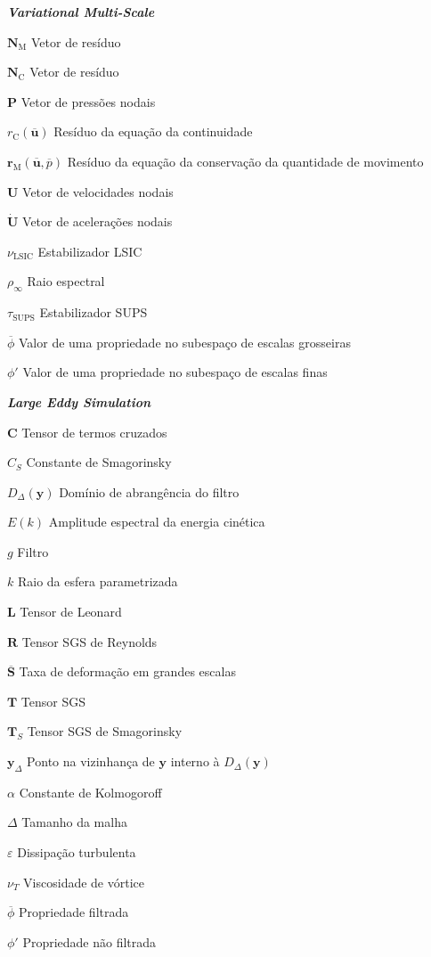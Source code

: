 \documentclass[12pt,
	openright,	%
	twoside,    %
	a4paper,			%
	sumario=tradicional,
	english,			%
	french, 			%
	brazil				%
]{USPSC}
\renewcommand{\bar}[1]{\overline{#1}}
\newcommand{\BB}[1]{\mathbf{#1}}
\newcommand{\BBB}[1]{\overline{\mathbf{#1}}}
\newcommand{\Dfil}{D_\Delta(\BB{y})}
\newcommand{\yfil}{\BB{y}_\Delta}
\newcommand{\deffil}{\bar{\mathbf{S}}}
\newcommand{\lsic}{\mathrm{LSIC}}
\newcommand{\sups}{\mathrm{SUPS}}
\newcommand{\rM}{\BB{r}_\mathrm{M}(\BBB{u},\bar{p})}
\newcommand{\rC}{r_\mathrm{C}(\BBB{u})}
\newcommand{\NM}{\BB{N}_\mathrm{M}}
\newcommand{\NC}{\BB{N}_\mathrm{C}}
\newcommand{\ep}{\varepsilon}
\begin{document}
\begin{simbolos}
    \item[\textbf{\textit{Variational Multi-Scale}}]
    \item[$\NM$] Vetor de resíduo
    \item[$\NC$] Vetor de resíduo
    \item[$\BB{P}$] Vetor de pressões nodais
    \item[$\rC$] Resíduo da equação da continuidade
    \item[$\rM$] Resíduo da equação da conservação da quantidade de movimento
    \item[$\BB{U}$] Vetor de velocidades nodais
    \item[$\dot{\BB{U}}$] Vetor de acelerações nodais
    \item[$\nu_\lsic$] Estabilizador LSIC
    \item[$\rho_\infty$] Raio espectral
    \item[$\tau_\sups$] Estabilizador SUPS
    \item[$\bar{\phi}$] Valor de uma propriedade no subespaço de escalas grosseiras
    \item[$\phi'$] Valor de uma propriedade no subespaço de escalas finas

    \item[\textbf{\textit{Large Eddy Simulation}}]
    \item[$\BB{C}$] Tensor de termos cruzados
    \item[$C_S$] Constante de Smagorinsky
    \item[$\Dfil$] Domínio de abrangência do filtro
    \item[$E(k)$] Amplitude espectral da energia cinética
    \item[$g$] Filtro
    \item[$k$] Raio da esfera parametrizada
    \item[$\BB{L}$] Tensor de Leonard
    \item[$\BB{R}$] Tensor SGS de Reynolds
    \item[$\deffil$] Taxa de deformação em grandes escalas
    \item[$\BB{T}$] Tensor SGS
    \item[$\BB{T}_S$] Tensor SGS de Smagorinsky
    \item[$\yfil$] Ponto na vizinhança de $\BB{y}$ interno à $\Dfil$
    \item[$\alpha$] Constante de Kolmogoroff
    \item[$\Delta$] Tamanho da malha
    \item[$\ep$] Dissipação turbulenta
    \item[$\nu_T$] Viscosidade de vórtice
    \item[$\bar{\phi}$] Propriedade filtrada
    \item[$\phi'$] Propriedade não filtrada


\end{simbolos}
\end{document}
